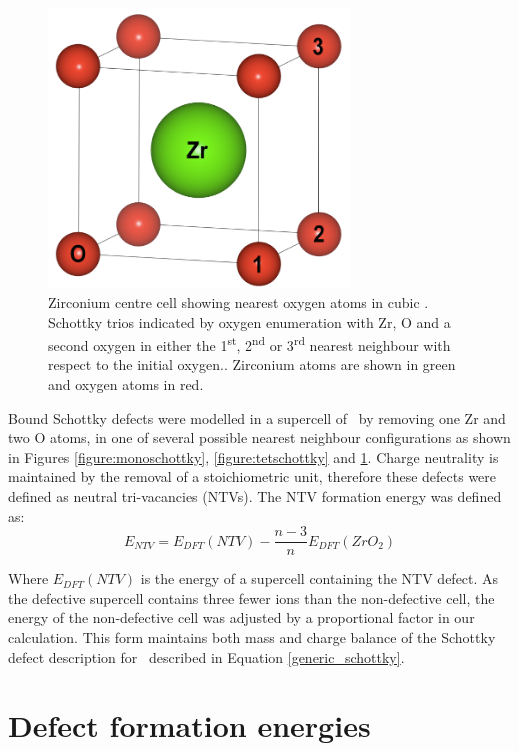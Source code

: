 \begin{figure}[ht] %
\centering
\includegraphics[width=8cm]{images/sd_cubic_zro2.png}
\caption{Zirconium centre cell showing nearest oxygen atoms in cubic \zirconia. Schottky trios indicated by oxygen enumeration with Zr, O and a second oxygen in either the 1\textsuperscript{st}, 2\textsuperscript{nd} or 3\textsuperscript{rd} nearest neighbour with respect to the initial oxygen.. Zirconium atoms are shown in green and oxygen atoms in red.}
\label{figure:cubicschottky}
\end{figure}

Bound Schottky defects were modelled in a supercell of \zirconia\ by removing one Zr and two O atoms, in one of several possible nearest neighbour configurations as shown in Figures \ref{figure:monoschottky}, \ref{figure:tetschottky} and \ref{figure:cubicschottky}. Charge neutrality is maintained by the removal of a stoichiometric unit, therefore these defects were defined as neutral tri-vacancies (NTVs). The NTV formation energy was defined as:
\begin{equation}
\label{equation_NTV}
E_{NTV} = E_{DFT}(NTV) - \frac{n-3}{n}E_{DFT}(ZrO_2)%
\end{equation}

Where $E_{DFT}(NTV)$ is the energy of a supercell containing the NTV defect. As the defective supercell contains three fewer ions than the non-defective cell, the energy of the non-defective cell was adjusted by a proportional factor in our calculation. This form maintains both mass and charge balance of the Schottky defect description for \zirconia\ described in Equation \ref{generic_schottky}.




\section{Defect formation energies} \label{dis_form_energy_intrinsic}

